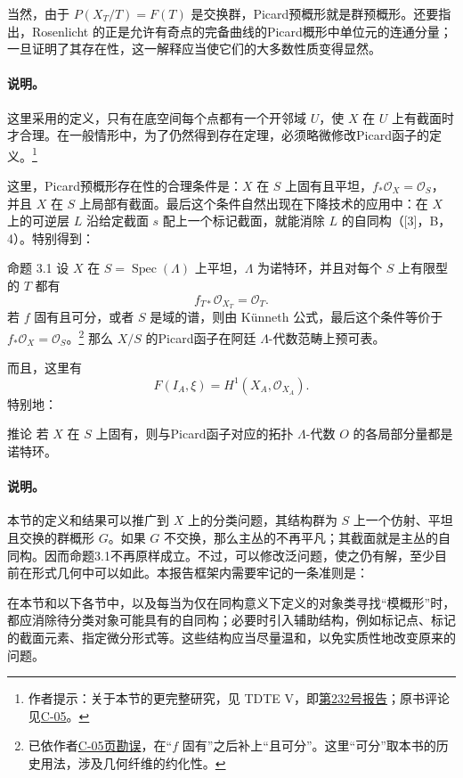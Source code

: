 当然，由于 $P(X_T/T)=F(T)$ 是交换群，Picard预概形就是群预概形。还要指出，Rosenlicht 的正是允许有奇点的完备曲线的Picard概形中单位元的连通分量；一旦证明了其存在性，这一解释应当使它们的大多数性质变得显然。
\paragraph{说明。}
这里采用的定义，只有在底空间每个点都有一个开邻域 $U$，使 $X$ 在 $U$ 上有截面时才合理。在一般情形中，为了仍然得到存在定理，必须略微修改Picard函子的定义。\footnote{作者提示：关于本节的更完整研究，见 TDTE V，即\hyperref[orig:167]{第232号报告}；原书评论见\hyperref[orig:7]{C-05}。}

这里，Picard预概形存在性的合理条件是：$X$ 在 $S$ 上固有且平坦，$f_*\mathcal O_X=\mathcal O_S$，并且 $X$ 在 $S$ 上局部有截面。最后这个条件自然出现在下降技术的应用中：在 $X$ 上的可逆层 $L$ 沿给定截面 $s$ 配上一个标记截面，就能消除 $L$ 的自同构（[3]，B，4）。特别得到：
\begin{statement}{命题 3.1}
设 $X$ 在 $S=\operatorname{Spec}(\Lambda)$ 上平坦，$\Lambda$ 为诺特环，并且对每个 $S$ 上有限型的 $T$ 都有
\[
 f_{T*}\mathcal O_{X_T}=\mathcal O_T.
\]
若 $f$ 固有且可分，或者 $S$ 是域的谱，则由 Künneth 公式，最后这个条件等价于 $f_*\mathcal O_X=\mathcal O_S$。\footnote{已依作者\hyperref[orig:7]{C-05页勘误}，在“$f$ 固有”之后补上“且可分”。这里“可分”取本书的历史用法，涉及几何纤维的约化性。}
那么 $X/S$ 的Picard函子在阿廷 $\Lambda$-代数范畴上预可表。
\end{statement}
而且，这里有
\[
 F(I_A,\xi)=H^1(X_A,\mathcal O_{X_A}).
\]
特别地：
\begin{statement}{推论}
若 $X$ 在 $S$ 上固有，则与Picard函子对应的拓扑 $\Lambda$-代数 $O$ 的各局部分量都是诺特环。
\end{statement}
\paragraph{说明。}
本节的定义和结果可以推广到 $X$ 上的分类问题，其结构群为 $S$ 上一个仿射、平坦且交换的群概形 $G$。如果 $G$ 不交换，那么主丛的不再平凡；其截面就是主丛的自同构。因而命题3.1不再原样成立。不过，可以修改泛问题，使之仍有解，至少目前在形式几何中可以如此。本报告框架内需要牢记的一条准则是：

在本节和以下各节中，以及每当为仅在同构意义下定义的对象类寻找“模概形”时，都应消除待分类对象可能具有的自同构；必要时引入辅助结构，例如标记点、标记的截面元素、指定微分形式等。这些结构应当尽量温和，以免实质性地改变原来的问题。
